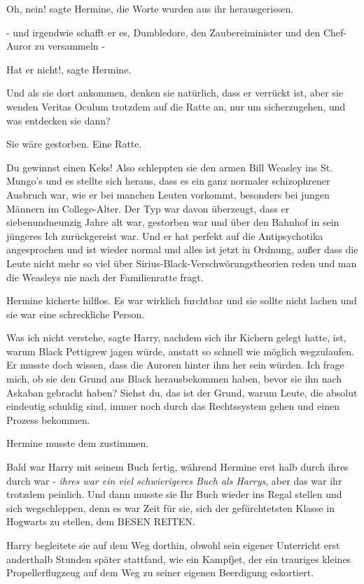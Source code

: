 \glqq{}Oh, nein!\grqq{} sagte Hermine, die Worte wurden aus ihr herausgerissen.

\glqq{}- und irgendwie schafft er es, Dumbledore, den Zaubereiminister und den
Chef-Auror zu versammeln -\grqq{}

\glqq{}Hat er nicht!\grqq{}, sagte Hermine.

\glqq{}Und als sie dort ankommen, denken sie natürlich, dass er verrückt ist,
aber sie wenden Veritas Oculum trotzdem auf die Ratte an, nur um sicherzugehen,
und was entdecken sie dann?\grqq{}

Sie wäre gestorben. \glqq{}Eine Ratte.\grqq{}

\glqq{}Du gewinnst einen Keks! Also schleppten sie den armen Bill Weasley ins
St. Mungo's und es stellte sich heraus, dass es ein ganz normaler schizophrener
Ausbruch war, wie er bei manchen Leuten vorkommt, besonders bei jungen Männern
im College-Alter. Der Typ war davon überzeugt, dass er siebenundneunzig Jahre
alt war, gestorben war und über den Bahnhof in sein jüngeres Ich zurückgereist
war. Und er hat perfekt auf die Antipsychotika angesprochen und ist wieder
normal und alles ist jetzt in Ordnung, außer dass die Leute nicht mehr so viel
über Sirius-Black-Verschwörungstheorien reden und man die Weasleys nie nach der
Familienratte fragt.\grqq{}

Hermine kicherte hilflos. Es war wirklich furchtbar und sie sollte nicht lachen
und sie war eine schreckliche Person.

\glqq{}Was ich nicht verstehe\grqq{}, sagte Harry, nachdem sich ihr Kichern
gelegt hatte, \glqq{}ist, warum Black Pettigrew jagen würde, anstatt so schnell
wie möglich wegzulaufen. Er musste doch wissen, dass die Auroren hinter ihm her
sein würden. Ich frage mich, ob sie den Grund aus Black herausbekommen haben,
bevor sie ihn nach Askaban gebracht haben? Siehst du, das ist der Grund, warum
Leute, die absolut eindeutig schuldig sind, immer noch durch das Rechtssystem
gehen und einen Prozess bekommen.\grqq{}

Hermine musste dem zustimmen.

Bald war Harry mit seinem Buch fertig, während Hermine erst halb durch ihres
durch war - \emph{ihres war ein viel schwierigeres Buch als Harrys}, aber das
war ihr trotzdem peinlich. Und dann musste sie Ihr Buch wieder ins Regal stellen
und sich wegschleppen, denn es war Zeit für sie, sich der gefürchtetsten Klasse
in Hogwarts zu stellen, dem BESEN REITEN.

Harry begleitete sie auf dem Weg dorthin, obwohl sein eigener Unterricht erst
anderthalb Stunden später stattfand, wie ein Kampfjet, der ein trauriges kleines
Propellerflugzeug auf dem Weg zu seiner eigenen Beerdigung eskortiert.

